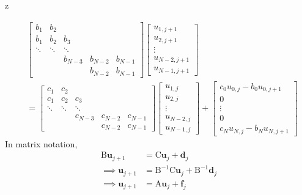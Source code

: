 z\documentclass[a4paper,12pt,twoside]{book}
\newcommand{\vect}[1]{\bm{#1}}
\newcommand{\mat}[1]{\bm{\mathrm{#1}}}
\begin{document}
\begin{equation}
    \begin{split}
        &\begin{bmatrix}
            b_1 & b_2 &  &  &  \\
            b_1 & b_2 & b_3 &  &  \\
            \ddots & \ddots & \ddots  &  &  \\
             &  &b_{N-3}  & b_{N-2} &b_{N-1}  \\
              &  &  & b_{N-2} & b_{N-1} 
        \end{bmatrix} \begin{bmatrix}
            u_{1,j+1}\\
            u_{2,j+1}\\
            \vdots\\
            u_{N-2,j+1}\\
            u_{N-1,j+1}
        \end{bmatrix}\\
        &=  \begin{bmatrix}
            c_1 & c_2 &  &  &  \\
            c_1 & c_2 & c_3 &  &  \\
            \ddots & \ddots & \ddots  &  &  \\
             &  &c_{N-3}  & c_{N-2} &c_{N-1}  \\
              &  &  & c_{N-2} & c_{N-1} 
        \end{bmatrix} \begin{bmatrix}
            u_{1,j}\\
            u_{2,j}\\
            \vdots\\
            u_{N-2,j}\\
            u_{N-1,j}
        \end{bmatrix}+
         \begin{bmatrix}
            c_0u_{0,j} - b_0u_{0,j+1}\\
            0\\
            \vdots\\
            0\\
            c_Nu_{N,j} - b_Nu_{N,j+1}
        \end{bmatrix}
    \end{split}
\end{equation}
In matrix notation,
\begin{equation}
    \begin{split}
        \mat{B}\vect{u}_{j+1} &= \mat{C}\vect{u}_{j} + \vect{d}_j\\
\implies \vect{u}_{j+1} &= \mat{B}^{-1}\mat{C}\vect{u}_j + \mat{B}^{-1} \vect{d}_j\\
\implies \vect{u}_{j+1} &= \mat{A}\vect{u}_j + \vect{f}_j
    \end{split}
\end{equation}
\end{document}
